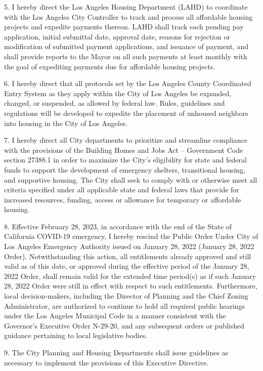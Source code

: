 \documentclass[12pt]{article}
\theoremstyle{definition}
\begin{document}
5. I hereby direct the Los Angeles Housing Department (LAHD) to coordinate with the Los Angeles City Controller to track and process all affordable housing projects and expedite payments thereon. LAHD shall track each pending pay application, initial submittal date, approval date, reasons for rejection or modification of submitted payment applications, and issuance of payment, and shall provide reports to the Mayor on all such payments at least monthly with the goal of expediting payments due for affordable housing projects.

6. I hereby direct that all protocols set by the Los Angeles County Coordinated Entry System as they apply within the City of Los Angeles be expanded, changed, or suspended, as allowed by federal law.  Rules, guidelines and regulations will be developed to expedite the placement of unhoused neighbors into housing in the City of Los Angeles. 

7. I hereby direct all City departments to prioritize and streamline compliance with the provisions of the Building Homes and Jobs Act – Government Code section 27388.1 in order to maximize the City’s eligibility for state and federal funds to support the development of emergency shelters, transitional housing, and supportive housing. The City shall seek to comply with or otherwise meet all criteria specified under all applicable state and federal laws that provide for increased resources, funding, access or allowance for temporary or affordable housing.

8. Effective February 28, 2023, in accordance with the end of the State of California COVID-19 emergency, I hereby rescind the Public Order Under City of Los Angeles Emergency Authority issued on January 28, 2022 (January 28, 2022 Order).  Notwithstanding this action, all entitlements already approved and still valid as of this date, or approved during the effective period of the January 28, 2022 Order, shall remain valid for the extended time period(s) as if such January 28, 2022 Order were still in effect with respect to such entitlements.  Furthermore, local decision-makers, including the Director of Planning and the Chief Zoning Administrator, are authorized to continue to hold all required public hearings under the Los Angeles Municipal Code in a manner consistent with the Governor’s Executive Order N-29-20, and any subsequent orders or published guidance pertaining to local legislative bodies. 

9.       The City Planning and Housing Departments shall issue guidelines as necessary to implement the provisions of this Executive Directive. 
\end{document}
